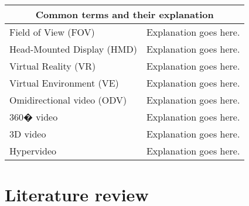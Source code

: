 \documentclass[a4paper,11pt,twoside]{report}
\begin{document}
\begin{tabular}{ | p{5.5cm} | p{6.5cm} |  }
	\hline
     	\multicolumn{2}{|c|}{Common terms and their explanation} \\
     	\hline
	Field of View (FOV) & Explanation goes here. \\
    	\hline
     	Head-Mounted Display (HMD) & Explanation goes here. \\
    	\hline
     	Virtual Reality (VR) & Explanation goes here. \\
    	\hline 
	Virtual Environment (VE) & Explanation goes here. \\
     	\hline
    	Omidirectional video (ODV) & Explanation goes here. \\
    	\hline
     	360� video & Explanation goes here. \\
     	\hline
     	3D video & Explanation goes here. \\
     	\hline
     	Hypervideo & Explanation goes here. \\
	\hline
\end{tabular}


\chapter{Literature review}        


\end{document}
